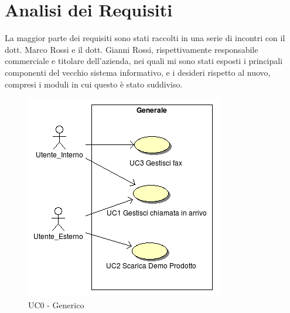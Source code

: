 \chapter{Analisi dei Requisiti}
La maggior parte dei requisiti sono stati raccolti in una serie di incontri con
il dott. Marco Rossi e il dott. Gianni Rossi, rispettivamente responsabile commerciale e titolare dell'azienda, 
nei quali mi sono stati esposti i principali componenti del vecchio sistema informativo, e i desideri rispetto al
nuovo, compresi i moduli in cui questo \`e stato suddiviso.

\begin{figure}[!ht]
\centering
 \includegraphics[scale=0.8]{./images/UC0_Generale.png}
\caption{UC0 - Generico}
\end{figure}





